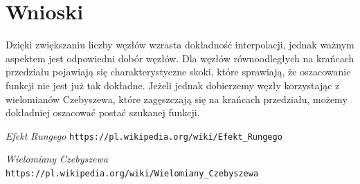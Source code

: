 \documentclass{article}
\begin{document}
\section{Wnioski}
Dzięki zwiększaniu liczby węzłów wzrasta dokładność interpolacji, jednak ważnym aspektem jest odpowiedni dobór węzłów. Dla węzłów równoodległych na krańcach przedziału pojawiają się charakterystyczne skoki, które sprawiają, że oszacowanie funkcji nie jest już tak dokładne. Jeżeli jednak dobierzemy węzły korzystając z wielomianów Czebyszewa, które zagęszczają się na krańcach przedziału, możemy dokładniej oszacować postać szukanej funkcji.

\begin{thebibliography}{2}

	\emph{Efekt Rungego} 
  \texttt{https://pl.wikipedia.org/wiki/Efekt\_Rungego}

	\emph{Wielomiany Czebyszewa} 
  \texttt{https://pl.wikipedia.org/wiki/Wielomiany\_Czebyszewa}

\end{thebibliography}
\end{document}
